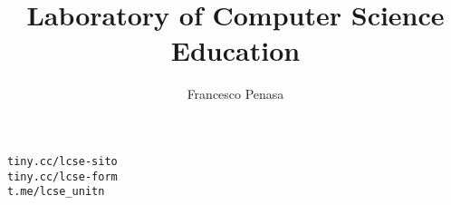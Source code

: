\documentclass[11pt]{article}
\begin{document}
\author{Francesco Penasa}
\title{Laboratory of Computer Science Education}
\maketitle

\medskip

\texttt{tiny.cc/lcse-sito}\\
\texttt{tiny.cc/lcse-form}\\
\texttt{t.me/lcse\_unitn}
\end{document}
